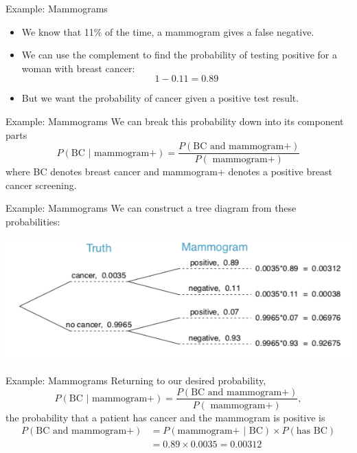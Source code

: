 \begin{frame}{Example: Mammograms}
    \begin{itemize}
        \item We know that 11\% of the time, a mammogram gives a false negative.
        \item We can use the complement to find the probability of testing positive for a woman with breast cancer:
        \[
        1-0.11=0.89
        \]
        \item But we want the probability of cancer given a positive test result.
    \end{itemize}
\end{frame}

\begin{frame}{Example: Mammograms}
    We can break this probability down into its component parts
    \[
        P(\text{BC } | \text{ mammogram+}) = \frac{P(\text{BC and mammogram+})}{P(\text{ mammogram+})}
    \]
    where BC denotes breast cancer and mammogram+ denotes a positive breast cancer screening.
\end{frame}

\begin{frame}{Example: Mammograms}
    We can construct a tree diagram from these probabilities:
    \begin{center}
        \includegraphics[scale=0.55]{images/treemam.png}
    \end{center}
\end{frame}

\begin{frame}{Example: Mammograms}
    Returning to our desired probability,
    \[
        P(\text{BC } | \text{ mammogram+}) = \frac{P(\text{BC and mammogram+})}{P(\text{ mammogram+})},
    \]
    the probability that a patient has cancer and the mammogram is positive is
    \begin{align*}
    P(\text{BC and mammogram+}) &= P(\text{mammogram+ } | \text{ BC})\times P(\text{has BC}) \\
    &= 0.89 \times 0.0035 = 0.00312
    \end{align*}
\end{frame}

